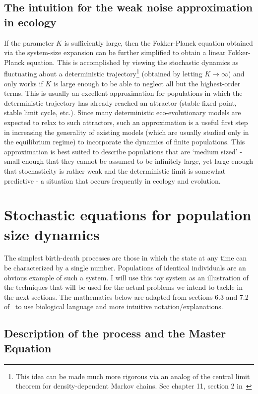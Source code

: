 \subsection{The intuition for the weak noise approximation in ecology}
If the parameter $K$ is sufficiently large, then the Fokker-Planck equation obtained via the system-size expansion can be further simplified to obtain a linear Fokker-Planck equation. This is accomplished by viewing the stochastic dynamics as fluctuating about a deterministic trajectory\footnote{This idea can be made much more rigorous via an analog of the central limit theorem for density-dependent Markov chains. See chapter 11, section 2 in~\citet{ethier_markov_1986}} (obtained by letting $K \to \infty$) and only works if $K$ is large enough to be able to neglect all but the highest-order terms. This is usually an excellent approximation for populations in which the deterministic trajectory has already reached an attractor (stable fixed point, stable limit cycle, etc.). Since many deterministic eco-evolutionary models are expected to relax to such attractors, such an approximation is a useful first step in increasing the generality of existing models (which are usually studied only in the equilibrium regime) to incorporate the dynamics of finite populations. This approximation is best suited to describe populations that are `medium sized' - small enough that they cannot be assumed to be infinitely large, yet large enough that stochasticity is rather weak and the deterministic limit is somewhat predictive - a situation that occurs frequently in ecology and evolution.

\section{Stochastic equations for population size dynamics}\label{chap_1D_processes}
The simplest birth-death processes are those in which the state at any time can be characterized by a single number. Populations of identical individuals are an obvious example of such a system. I will use this toy system as an illustration of the techniques that will be used for the actual problems we intend to tackle in the next sections. The mathematics below are adapted from sections 6.3 and 7.2 of~\citet{gardiner_stochastic_2009} to use biological language and more intuitive notation/explanations.

\subsection{Description of the process and the Master Equation}

